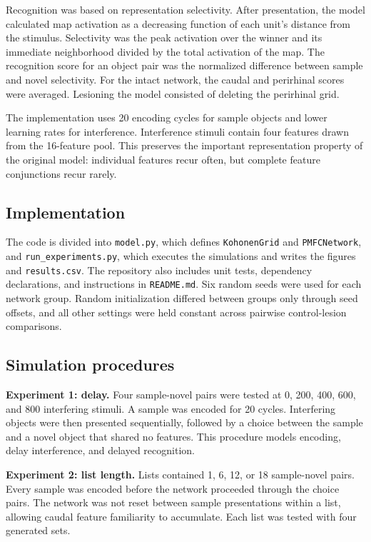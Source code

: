 \documentclass[11pt]{article}
\begin{document}
Recognition was based on representation selectivity. After presentation, the model calculated map activation as a decreasing function of each unit's distance from the stimulus. Selectivity was the peak activation over the winner and its immediate neighborhood divided by the total activation of the map. The recognition score for an object pair was the normalized difference between sample and novel selectivity. For the intact network, the caudal and perirhinal scores were averaged. Lesioning the model consisted of deleting the perirhinal grid.

The implementation uses 20 encoding cycles for sample objects and lower learning rates for interference. Interference stimuli contain four features drawn from the 16-feature pool. This preserves the important representation property of the original model: individual features recur often, but complete feature conjunctions recur rarely.

\subsection{Implementation}
The code is divided into \texttt{model.py}, which defines \texttt{KohonenGrid} and \texttt{PMFCNetwork}, and \texttt{run\_experiments.py}, which executes the simulations and writes the figures and \texttt{results.csv}. The repository also includes unit tests, dependency declarations, and instructions in \texttt{README.md}. Six random seeds were used for each network group. Random initialization differed between groups only through seed offsets, and all other settings were held constant across pairwise control-lesion comparisons.

\subsection{Simulation procedures}
\textbf{Experiment 1: delay.} Four sample-novel pairs were tested at 0, 200, 400, 600, and 800 interfering stimuli. A sample was encoded for 20 cycles. Interfering objects were then presented sequentially, followed by a choice between the sample and a novel object that shared no features. This procedure models encoding, delay interference, and delayed recognition.

\textbf{Experiment 2: list length.} Lists contained 1, 6, 12, or 18 sample-novel pairs. Every sample was encoded before the network proceeded through the choice pairs. The network was not reset between sample presentations within a list, allowing caudal feature familiarity to accumulate. Each list was tested with four generated sets.
\end{document}
